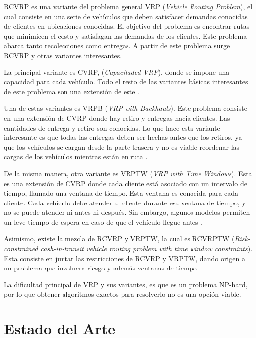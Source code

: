 \documentclass[letter, 10pt]{article}
\begin{document}
RCVRP es una variante del problema general VRP (\textit{Vehicle Routing Problem}), el cual consiste en una serie de vehículos que deben satisfacer demandas conocidas de clientes en ubicaciones conocidas. El objetivo del problema es encontrar rutas que minimicen el costo y satisfagan las demandas de los clientes. Este problema abarca tanto recolecciones como entregas. A partir de este problema surge RCVRP y otras variantes interesantes.

La principal variante es CVRP, (\textit{Capacitaded VRP}), donde se impone una capacidad para cada vehículo. Todo el resto de las variantes básicas interesantes de este problema son una extensión de este \cite{toth2002overview}.

Una de estas variantes es VRPB (\textit{VRP with Backhauls}). Este problema consiste en una extensión de CVRP donde hay retiro y entregas hacia clientes. Las cantidades de entrega y retiro son conocidas. Lo que hace esta variante interesante es que todas las entregas deben ser hechas antes que los retiros, ya que los vehículos se cargan desde la parte trasera y no es viable reordenar las cargas de los vehículos mientras están en ruta \cite{joetschalckx1989vehicle}.

De la misma manera, otra variante es VRPTW (\textit{VRP with Time Windows}). Esta es una extensión de CVRP donde cada cliente está asociado con un intervalo de tiempo, llamado una ventana de tiempo. Esta ventana es conocida para cada cliente. Cada vehículo debe atender al cliente durante esa ventana de tiempo, y no se puede atender ni antes ni después. Sin embargo, algunos modelos permiten un leve tiempo de espera en caso de que el vehículo llegue antes \cite{ombuki2006multi}. 

Asimismo, existe la mezcla de RCVRP y VRPTW, la cual es RCVRPTW (\textit{Risk-constrained cash-in-transit vehicle routing problem with time window constraints}). Esta consiste en juntar las restricciones de RCVRP y VRPTW, dando origen a un problema que involucra riesgo y además ventanas de tiempo. \cite{talarico2013risk}

La dificultad principal de VRP y sus variantes, es que es un problema NP-hard\cite{lenstra1981complexity}, por lo que obtener algoritmos exactos para resolverlo no es una opción viable.  
\newpage
\section{Estado del Arte}
\end{document}
